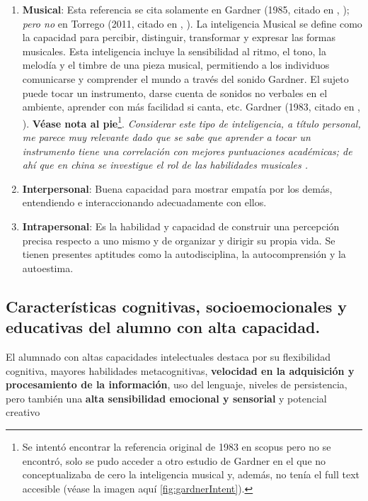 \documentclass[12pt, a4paper]{article}
\begin{document}
\begin{enumerate}
		\item \textbf{Musical}: Esta referencia se cita solamente en Gardner (1985, citado en \citeauthor{Arocas2002OrientPsicopedGVA}, \citeyear{Arocas2002OrientPsicopedGVA}); \textit{pero no} en Torrego (2011, citado en \citeauthor{reche2019models}, \citeyear{reche2019models}). La inteligencia Musical se define como la capacidad para percibir, distinguir, transformar y expresar las formas musicales. Esta inteligencia incluye la sensibilidad al ritmo, el tono, la melodía y el timbre de una pieza musical, permitiendo a los individuos comunicarse y comprender el mundo a través del sonido Gardner. El sujeto puede tocar un instrumento, darse cuenta de sonidos no verbales en el ambiente, aprender con más facilidad si canta, etc. Gardner (1983, citado en \citeauthor{piperMusicalIntelligence}, \citeyear{piperMusicalIntelligence}). \textbf{Véase nota al pie}\footnote{Se intentó encontrar la referencia original de 1983 en scopus pero no se encontró, solo se pudo acceder a otro estudio de Gardner en el que no conceptualizaba de cero la inteligencia musical y, además, no tenía el full text accesible (véase la imagen aquí \ref{fig:gardnerIntent}).}. \textit{Considerar este tipo de inteligencia, a título personal, me parece muy relevante dado que se sabe que aprender a tocar un instrumento tiene una correlación con mejores puntuaciones académicas; de ahí que en china se investigue el rol de las habilidades musicales  \parencite{multiplesInteligenciesMusicaXinaSCOPUS}.}
		
		\item \textbf{Interpersonal}: Buena capacidad para mostrar empatía por los demás, entendiendo e interaccionando adecuadamente con ellos.
		
		\item \textbf{Intrapersonal}: Es la habilidad y capacidad de construir una percepción precisa respecto a uno mismo y de organizar y dirigir su propia vida. Se tienen presentes aptitudes como la autodisciplina, la autocomprensión y la autoestima.
	\end{enumerate}
	
	
	
	
	\subsection{Características cognitivas, socioemocionales y educativas del alumno con alta capacidad.}
	
	El alumnado con altas capacidades intelectuales destaca por su flexibilidad cognitiva, mayores habilidades
	metacognitivas, \textbf{velocidad en la adquisición y procesamiento de la información}, uso del lenguaje, niveles
	de persistencia, pero también una \textbf{alta sensibilidad emocional y sensorial} y
	potencial creativo \parencite[9]{gobiernoVascoPlanAACC2019_recomanatUned}
	
\end{document}
